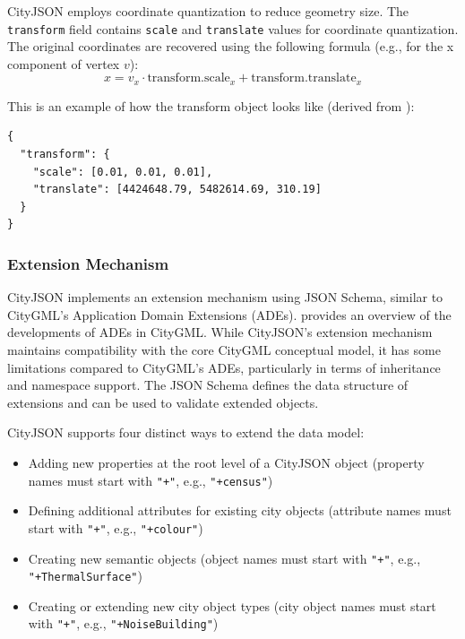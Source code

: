 CityJSON employs coordinate quantization to reduce geometry size. The \texttt{transform} field contains \texttt{scale} and \texttt{translate} values for coordinate quantization. The original coordinates are recovered using the following formula (e.g., for the x component of vertex $v$):
\begin{equation}
  \label{eq:cityjson:coordinate_quantisation}
  x = v_x \cdot \text{transform.scale}_x + \text{transform.translate}_x
\end{equation}

This is an example of how the transform object looks like (derived from \citet{ledoux_2019}):
\begin{lstlisting}
{
  "transform": {
    "scale": [0.01, 0.01, 0.01],
    "translate": [4424648.79, 5482614.69, 310.19]
  }
}
\end{lstlisting}

\subsubsection{Extension Mechanism}
\label{rw:cityjson:extension_mechanism}

CityJSON implements an extension mechanism using JSON Schema, similar to CityGML's Application Domain Extensions (ADEs).
\citet{fillip_2018} provides an overview of the developments of ADEs in CityGML. While CityJSON's extension mechanism maintains compatibility with the core CityGML conceptual model, it has some limitations compared to CityGML's ADEs, particularly in terms of inheritance and namespace support.
The JSON Schema defines the data structure of extensions and can be used to validate extended objects.

CityJSON supports four distinct ways to extend the data model:

\begin{itemize}
  \item Adding new properties at the root level of a CityJSON object (property names must start with \texttt{"+"}, e.g., \texttt{"+census"})
  \item Defining additional attributes for existing city objects (attribute names must start with \texttt{"+"}, e.g., \texttt{"+colour"})
  \item Creating new semantic objects (object names must start with \texttt{"+"}, e.g., \texttt{"+ThermalSurface"})
  \item Creating or extending new city object types (city object names must start with \texttt{"+"}, e.g., \texttt{"+NoiseBuilding"})
\end{itemize}

